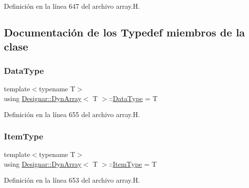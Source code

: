 Definición en la línea 647 del archivo array.\+H.



\subsection{Documentación de los \textquotesingle{}Typedef\textquotesingle{} miembros de la clase}
\mbox{\label{class_designar_1_1_dyn_array_aa683f9cc296f4597784541837e234d83}} 
\subsubsection{\texorpdfstring{Data\+Type}{DataType}}
{\footnotesize\ttfamily template$<$typename T$>$ \\
using \hyperlink{class_designar_1_1_dyn_array}{Designar\+::\+Dyn\+Array}$<$ T $>$\+::\hyperlink{class_designar_1_1_fixed_array_a3e37931b909b840cb7a40fc73f12bcf5}{Data\+Type} =  T}



Definición en la línea 655 del archivo array.\+H.

\mbox{\label{class_designar_1_1_dyn_array_af4ff8919b3ae0778aa749130ee0e35f7}} 
\subsubsection{\texorpdfstring{Item\+Type}{ItemType}}
{\footnotesize\ttfamily template$<$typename T$>$ \\
using \hyperlink{class_designar_1_1_dyn_array}{Designar\+::\+Dyn\+Array}$<$ T $>$\+::\hyperlink{class_designar_1_1_fixed_array_abfeb4e683cee75ae782ad20294c4c808}{Item\+Type} =  T}



Definición en la línea 653 del archivo array.\+H.

\mbox{\label{class_designar_1_1_dyn_array_a80080a85ac9ccbe95c17bc0c665e70b4}} 
